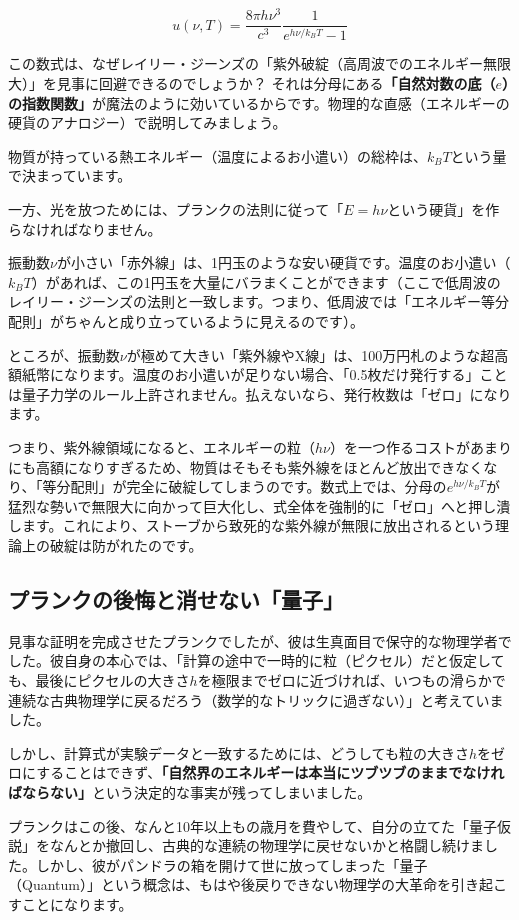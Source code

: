 \[u(\nu, T) = \frac{8\pi h \nu^3}{c^3} \frac{1}{e^{h\nu/k_B T} - 1}\]

この数式は、なぜレイリー・ジーンズの「紫外破綻（高周波でのエネルギー無限大）」を見事に回避できるのでしょうか？ それは分母にある\textbf{「自然対数の底（\(e\)）の指数関数」}が魔法のように効いているからです。物理的な直感（エネルギーの硬貨のアナロジー）で説明してみましょう。

物質が持っている熱エネルギー（温度によるお小遣い）の総枠は、\(k_B T\)という量で決まっています。

一方、光を放つためには、プランクの法則に従って「\(E = h\nu\)という硬貨」を作らなければなりません。

振動数\(\nu\)が小さい「赤外線」は、1円玉のような安い硬貨です。温度のお小遣い（\(k_B T\)）があれば、この1円玉を大量にバラまくことができます（ここで低周波のレイリー・ジーンズの法則と一致します。つまり、低周波では「エネルギー等分配則」がちゃんと成り立っているように見えるのです）。

ところが、振動数\(\nu\)が極めて大きい「紫外線やX線」は、100万円札のような超高額紙幣になります。温度のお小遣いが足りない場合、「0.5枚だけ発行する」ことは量子力学のルール上許されません。払えないなら、発行枚数は「ゼロ」になります。

つまり、紫外線領域になると、エネルギーの粒（\(h\nu\)）を一つ作るコストがあまりにも高額になりすぎるため、物質はそもそも紫外線をほとんど放出できなくなり、「等分配則」が完全に破綻してしまうのです。数式上では、分母の\(e^{h\nu/k_B T}\)が猛烈な勢いで無限大に向かって巨大化し、式全体を強制的に「ゼロ」へと押し潰します。これにより、ストーブから致死的な紫外線が無限に放出されるという理論上の破綻は防がれたのです。

\subsection{プランクの後悔と消せない「量子」}

見事な証明を完成させたプランクでしたが、彼は生真面目で保守的な物理学者でした。彼自身の本心では、「計算の途中で一時的に粒（ピクセル）だと仮定しても、最後にピクセルの大きさ\(h\)を極限までゼロに近づければ、いつもの滑らかで連続な古典物理学に戻るだろう（数学的なトリックに過ぎない）」と考えていました。

しかし、計算式が実験データと一致するためには、どうしても粒の大きさ\(h\)をゼロにすることはできず、\textbf{「自然界のエネルギーは本当にツブツブのままでなければならない」}という決定的な事実が残ってしまいました。

プランクはこの後、なんと10年以上もの歳月を費やして、自分の立てた「量子仮説」をなんとか撤回し、古典的な連続の物理学に戻せないかと格闘し続けました。しかし、彼がパンドラの箱を開けて世に放ってしまった「量子（Quantum）」という概念は、もはや後戻りできない物理学の大革命を引き起こすことになります。

